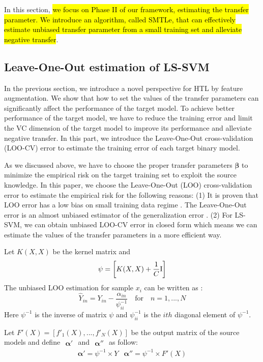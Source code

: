 In this section, \hl{we focus on Phase II of our framework, estimating the transfer parameter. We introduce an algorithm, called SMTLe, that can effectively estimate unbiased transfer parameter from a small training set and alleviate negative transfer}. 

\subsection{Leave-One-Out estimation of LS-SVM }
In the previous section, we introduce a novel perspective for HTL by feature augmentation. We show that how to set the values of the transfer parameters can significantly affect the performance of the target model. To achieve better performance of the target model, we have to reduce the training error and limit the VC dimension of the target model to improve its performance and alleviate negative transfer. In this part, we introduce the Leave-One-Out cross-validation  (LOO-CV) error to estimate the training error of each target binary model.


As we discussed above, we have to choose the proper transfer parameters $\boldsymbol{\beta}$ to minimize the empirical risk on the target training set to exploit the source knowledge.
In this paper, we choose the Leave-One-Out (LOO) cross-validation error to estimate the empirical risk for the following reasons: (1) It is proven that LOO error has a low bias on small training data regime \cite{kuzborskij2013stability}. The Leave-One-Out error is an almost unbiased estimator of the generalization error \cite{elisseeff2003leave}. (2) For LS-SVM, we can obtain unbiased LOO-CV error in closed form which means we can estimate the values of the transfer parameters in a more efficient way.

Let $K(X,X)$ be the kernel matrix and
\begin{equation}\label{eq:linear}
\psi=\left[ 
{K(X,X) + \frac{1}{C}{\rm{I}}} \right]
\end{equation}
The unbiased LOO estimation for sample $x_i$ can be written as \cite{cawley2006leave}:
\begin{equation} \label{eq:loo}
{\hat Y_{in}} = {Y_{in}} - \frac{{{\alpha _{in}}}}{{\psi_{ii}^{ - 1}}}\quad {\text{for}}\quad n = 1,...,N
\end{equation}
Here $\psi^{-1}$ is the inverse of matrix $\psi$ and  $\psi_{ii}^{-1}$ is the $ith$ diagonal element of $\psi^{-1}$. 

Let $F'(X)=\left[f'_1(X),...,f'_N(X)\right]$ be the output matrix of the source models and define $\begin{array}{c}\boldsymbol{\alpha'} \end{array}$ and $\begin{array}{c}\boldsymbol{\alpha}''\end{array}$ as follow:
\begin{equation}
\begin{array}{cc}
\boldsymbol{\alpha'} =\psi^{-1} \times Y & \boldsymbol{\alpha''} =\psi^{-1} \times F'(X)
\end{array}
\end{equation}

